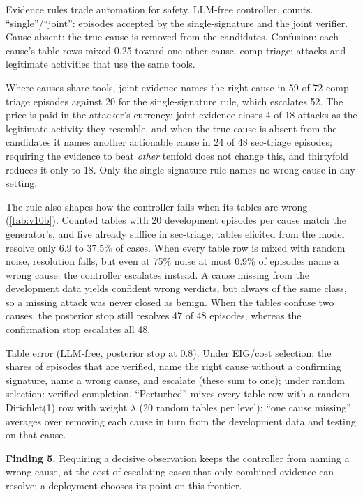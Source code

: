 \begin{table}[t]
  \caption{Evidence rules trade automation for safety. LLM-free controller, counts. ``single''/``joint'': episodes accepted by the single-signature and the joint verifier. Cause absent: the true cause is removed from the candidates. Confusion: each cause's table rows mixed 0.25 toward one other cause. comp-triage: attacks and legitimate activities that use the same tools.}
  \label{tab:v12policy}
  \centering\small
  \begin{adjustbox}{max width=\textwidth}\end{adjustbox}
\end{table}

Where causes share tools, joint evidence names the right cause in 59 of 72 comp-triage episodes against 20 for the single-signature rule, which escalates 52. The price is paid in the attacker's currency: joint evidence closes 4 of 18 attacks as the legitimate activity they resemble, and when the true cause is absent from the candidates it names another actionable cause in 24 of 48 sec-triage episodes; requiring the evidence to beat \textit{other} tenfold does not change this, and thirtyfold reduces it only to 18. Only the single-signature rule names no wrong cause in any setting.

The rule also shapes how the controller fails when its tables are wrong (\cref{tab:v10b}). Counted tables with 20 development episodes per cause match the generator's, and five already suffice in sec-triage; tables elicited from the model resolve only 6.9 to 37.5\% of cases. When every table row is mixed with random noise, resolution falls, but even at 75\% noise at most 0.9\% of episodes name a wrong cause: the controller escalates instead. A cause missing from the development data yields confident wrong verdicts, but always of the same class, so a missing attack was never closed as benign. When the tables confuse two causes, the posterior stop still resolves 47 of 48 episodes, whereas the confirmation stop escalates all 48.

\begin{table}[t]
  \caption{Table error (LLM-free, posterior stop at 0.8). Under EIG/cost selection: the shares of episodes that are verified, name the right cause without a confirming signature, name a wrong cause, and escalate (these sum to one); under random selection: verified completion. ``Perturbed'' mixes every table row with a random Dirichlet(1) row with weight $\lambda$ (20 random tables per level); ``one cause missing'' averages over removing each cause in turn from the development data and testing on that cause.}
  \label{tab:v10b}
  \centering\small
  \begin{adjustbox}{max width=\textwidth}\end{adjustbox}
\end{table}

\smallskip\noindent\textbf{Finding 5.} Requiring a decisive observation keeps the controller from naming a wrong cause, at the cost of escalating cases that only combined evidence can resolve; a deployment chooses its point on this frontier.
